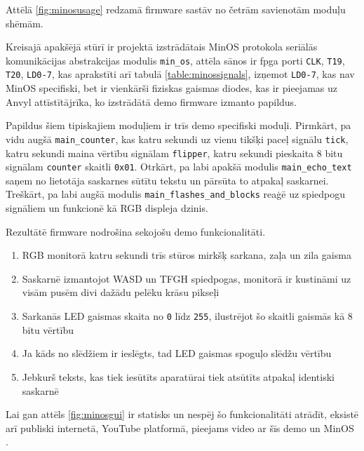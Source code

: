 Attēlā \ref{fig:minosusage} redzamā \gls{firmware} sastāv no četrām savienotām
moduļu shēmām. 

Kreisajā apakšējā stūrī ir projektā izstrādātais MinOS protokola seriālās
komunikācijas abstrakcijas modulis \lstinline!min_os!, attēla sānos ir
\gls{fpga} porti \lstinline!CLK!, \lstinline!T19!, \lstinline!T20!,
\lstinline!LD0-7!, kas aprakstīti arī tabulā \ref{table:minossignals}, izņemot
\lstinline!LD0-7!, kas nav MinOS specifiski, bet ir vienkārši fiziskas gaismas
diodes, kas ir pieejamas uz Anvyl attīstītājrīka, ko izstrādātā demo
\gls{firmware} izmanto papildus. 

Papildus šiem tipiskajiem moduļiem ir trīs demo
 specifiski moduļi. Pirmkārt, pa vidu
augšā \lstinline!main_counter!, kas katru sekundi uz vienu tikšķi paceļ signālu
\lstinline!tick!, katru sekundi maina vērtību signālam \lstinline!flipper!,
katru sekundi pieskaita 8 bitu signālam \lstinline!counter! skaitli
\lstinline!0x01!. Otrkārt, pa labi apakšā modulis \lstinline!main_echo_text!
saņem no lietotāja saskarnes sūtītu tekstu un pārsūta to atpakaļ saskarnei.
Treškārt, pa labi augšā modulis \lstinline!main_flashes_and_blocks! reaģē uz
spiedpogu signāliem un funkcionē kā RGB displeja dzinis.

Rezultātē \gls{firmware} nodrošina sekojošu  demo funkcionalitāti.
\begin{enumerate}
    \item RGB monitorā katru sekundi trīs stūros mirkšķ sarkana, zaļa un zila
        gaisma
    \item Saskarnē izmantojot WASD un TFGH spiedpogas, monitorā ir kustināmi uz
        visām pusēm divi dažādu pelēku krāsu pikseļi
    \item Sarkanās LED gaismas skaita no \lstinline!0! līdz \lstinline!255!,
        ilustrējot šo skaitli gaismās kā 8 bitu vērtību
    \item Ja kāds no slēdžiem ir ieslēgts, tad LED gaismas spoguļo slēdžu
        vērtību
    \item Jebkurš teksts, kas tiek iesūtīts aparatūrai tiek atsūtīts atpakaļ
        identiski saskarnē
\end{enumerate}

Lai gan attēls \ref{fig:minosgui} ir statisks un nespēj šo funkcionalitāti
atrādīt, eksistē arī publiski internetā, YouTube platformā, pieejams video ar
šīs demo  un MinOS
.
\cite{VeinbahsKrisjanisDemo} 
